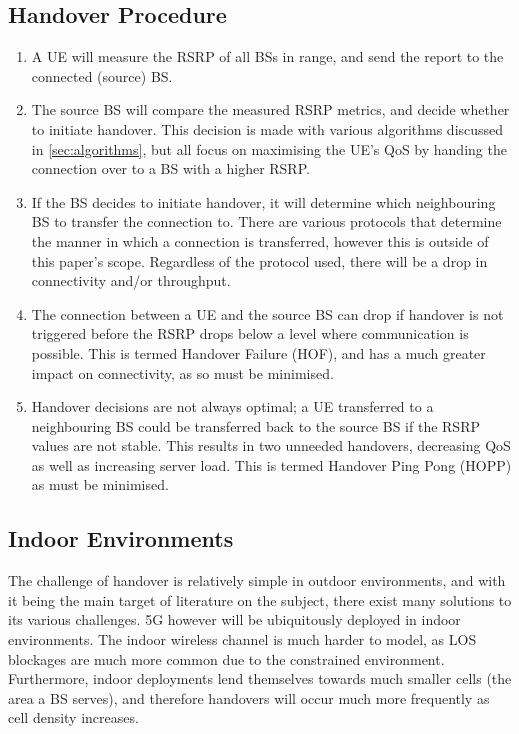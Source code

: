 \subsection{Handover Procedure}
\begin{enumerate}
    \item A UE will measure the RSRP of all BSs in range, and send the report to the connected (source) BS.
    \item The source BS will compare the measured RSRP metrics, and decide whether to initiate handover. This decision is made with various algorithms discussed in \ref{sec:algorithms}, but all focus on maximising the UE's QoS by handing the connection over to a BS with a higher RSRP.
    \item If the BS decides to initiate handover, it will determine which neighbouring BS to transfer the connection to. There are various protocols that determine the manner in which a connection is transferred, however this is outside of this paper's scope. Regardless of the protocol used, there will be a drop in connectivity and/or throughput.
    \item The connection between a UE and the source BS can drop if handover is not triggered before the RSRP drops below a level where communication is possible. This is termed Handover Failure (HOF), and has a much greater impact on connectivity, as so must be minimised.
    \item Handover decisions are not always optimal; a UE transferred to a neighbouring BS could be transferred back to the source BS if the RSRP values are not stable. This results in two unneeded handovers, decreasing QoS as well as increasing server load. This is termed Handover Ping Pong (HOPP) as must be minimised.
\end{enumerate}

\subsection{Indoor Environments}
The challenge of handover is relatively simple in outdoor environments, and with it being the main target of literature on the subject, there exist many solutions to its various challenges. 5G however will be ubiquitously deployed in indoor environments. The indoor wireless channel is much harder to model, as LOS blockages are much more common due to the constrained environment. Furthermore, indoor deployments lend themselves towards much smaller cells (the area a BS serves), and therefore handovers will occur much more frequently as cell density increases.

